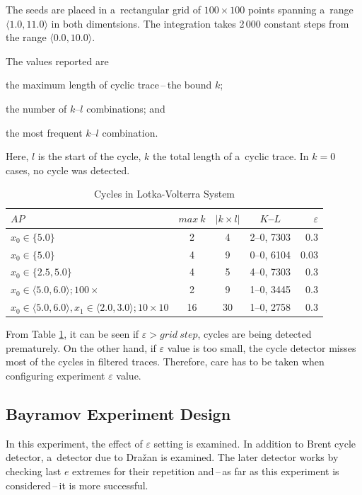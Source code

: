 \documentclass[12pt,twoside,draft]{fithesis}
\begin{document}
The seeds are placed in a~rectangular grid of $100\times 100$ points
spanning a~range $\langle 1.0, 11.0\rangle$ in both dimentsions. The
integration takes 2\,000 constant steps from the range $\langle 0.0,
10.0\rangle$.

The values reported are
\begin{inparaenum}
\item the maximum length of cyclic trace\,--\,the bound $k$;
\item the number of $k$--$l$ combinations; and
\item the most frequent $k$--$l$ combination.
\end{inparaenum}

Here, $l$ is the start of the cycle, $k$ the total length of a~cyclic
trace. In $k=0$ cases, no cycle was detected.
\begin{table}[h]
\label{tab:lv}
\begin{tabular}{p{4cm}|c c c r}
$AP$ &$max\:k$ &$|k\times l|$ &$K$--$L$ &$\varepsilon$\\
\hline
$x_0\in\{5.0\}$
	&2
	&4
	&2--0, 7303
	&0.3\\
$x_0\in\{5.0\}$
	&4
	&9
	&0--0, 6104
	&0.03\\
$x_0\in\{2.5,5.0\}$
	&4
	&5
	&4--0, 7303
	&0.3\\
$x_0\in\langle 5.0,6.0\rangle;100\times$
	&2
	&9
	&1--0, 3445
	&0.3\\
$x_0\in\langle 5.0,6.0\rangle, x_1\in\langle 2.0,3.0\rangle;10\times 10$
	&16
	&30
	&1--0, 2758
	&0.3\\
\end{tabular}
\caption{Cycles in Lotka-Volterra System}
\end{table}

From Table \ref{tab:lv}, it can be seen if $\varepsilon>grid\:step$,
cycles are being detected prematurely. On the other hand,
if $\varepsilon$ value is too small, the cycle detector misses most of
the cycles in filtered traces. Therefore, care has to be taken
when configuring experiment $\varepsilon$ value.

\subsection*{Bayramov Experiment Design}
In this experiment, the effect of $\varepsilon$ setting is examined. In
addition to Brent cycle detector, a~detector due to Dra\v{z}an
\cite{sven} is examined. The later detector works by checking last $e$
extremes for their repetition and\,--\,as far as this experiment is
considered\,--\,it is more successful.
\end{document}
